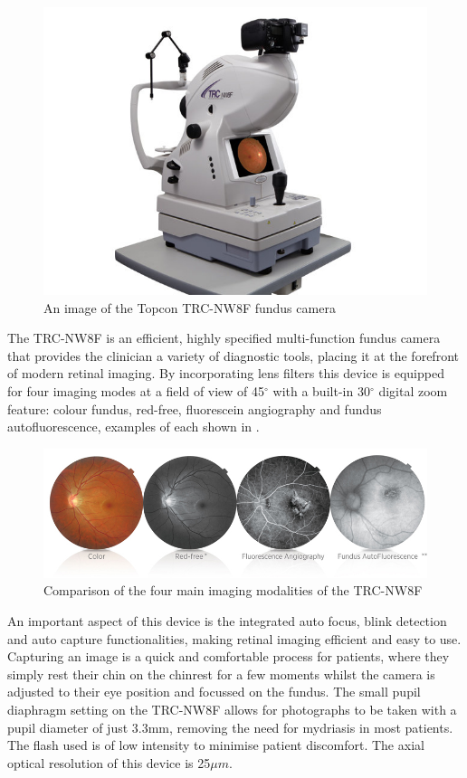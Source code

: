 \begin{figure}[htbp]
\centering
\includegraphics{figures/trc}
\caption{An image of the Topcon TRC-NW8F fundus camera}
\label{fig:trc}
\end{figure}


The TRC-NW8F is an efficient, highly specified multi-function fundus camera
that provides the clinician a variety of diagnostic tools, placing it at the
forefront of modern retinal imaging. By incorporating lens filters this device
is equipped for four imaging modes at a field of view of 45$^\circ$ with a
built-in 30$^\circ$ digital zoom feature: colour fundus, red-free, fluorescein
angiography and fundus autofluorescence, examples of each shown in .

\begin{figure}[htbp]
\centering
\includegraphics{figures/imagingmodes}
\caption{Comparison of the four main imaging modalities of the TRC-NW8F}
\label{fig:im}
\end{figure}


An important aspect of this device is the integrated auto focus, blink
detection and auto capture functionalities, making retinal imaging efficient
and easy to use. Capturing an image is a quick and comfortable process for
patients, where they simply rest their chin on the chinrest for a few moments
whilst the camera is adjusted to their eye position and focussed on the fundus.
The small pupil diaphragm setting on the TRC-NW8F allows for photographs to be
taken with a pupil diameter of just 3.3mm, removing the need for mydriasis in
most patients. The flash used is of low intensity to minimise patient discomfort.
The axial optical resolution of this device is 25$\mu m$.



